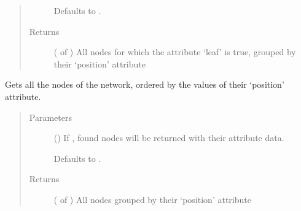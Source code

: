 \documentclass[letterpaper,10pt,english]{sphinxmanual}
\begin{document}
\begin{fulllineitems}
\begin{fulllineitems}
\begin{quote}
\begin{description}
Defaults to .


\item[{Returns}] \leavevmode
{} ( of ) \textendash{} All nodes for which the attribute ‘leaf’ is true, grouped by their
‘position’ attribute

\end{description}\end{quote}

\end{fulllineitems}


\begin{fulllineitems}
\label{\detokenize{cockatoo:cockatoo.KnitNetworkBase.all_nodes_by_position}}
Gets all the nodes of the network, ordered by the values of their
‘position’ attribute.
\begin{quote}\begin{description}
\item[{Parameters}] \leavevmode
{} (\sphinxstyleliteralemphasis{\sphinxupquote{, }}) \textendash{} 
If , found nodes will be returned with their attribute data.

Defaults to .


\item[{Returns}] \leavevmode
{} ( of ) \textendash{} All nodes grouped by their ‘position’ attribute

\end{description}\end{quote}

\end{fulllineitems}



\end{fulllineitems}
\end{document}
